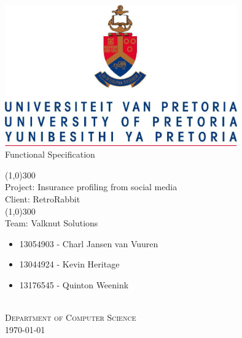 \documentclass{article}
\begin{document}
	\begin{titlepage}
		\begin{center}
			\includegraphics[width=10cm]{images/UP.jpg}  \\
			[0.5cm]
			\huge{
			Functional Specification\\
			}

			\line(1,0){300}\\
			[0.2cm]
			\LARGE{Project: Insurance profiling from social media\\
			Client: RetroRabbit} \\
			\line(1,0){300}\\
			\LARGE{Team: Valknut Solutions}\\
			[1.0cm]
			\large
			{
			\begin{itemize}
				\item 13054903 - Charl Jansen van Vuuren
				\item 13044924 - Kevin Heritage
				\item 13176545 - Quinton Weenink\\
			\end{itemize}
			}
			\textsc{\large}\\
		[3.0cm]
		\textsc{\large  Department of Computer Science}\\
		[0.5cm]
		\textsc{\large \today}\\
		\end{center}


	\end{titlepage}
	\cleardoublepage
	\tableofcontents
	\cleardoublepage
	\begin{versionhistory}
	\end{versionhistory}
	
\end{document}
